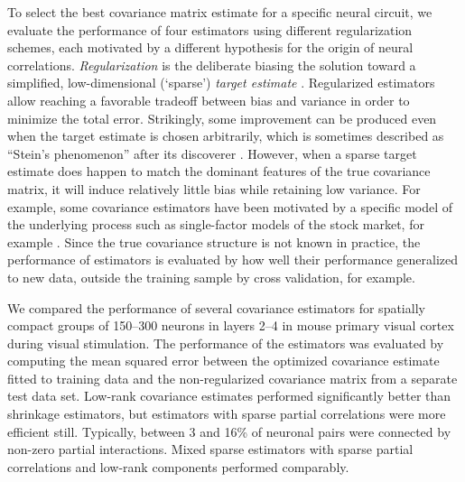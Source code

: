 To select the best covariance matrix estimate for a specific neural circuit, we evaluate the performance of four estimators using different regularization schemes, each motivated by  a different hypothesis for the origin of neural correlations. \emph{Regularization} is the deliberate biasing the solution toward a simplified, low-dimensional (`sparse') \emph{target estimate} \citep{Schafer:2005,Bickel:2006}.
Regularized estimators allow reaching a favorable tradeoff between bias and variance in order to minimize the total error.
Strikingly, some improvement can be produced even when the target estimate is chosen arbitrarily, which is sometimes described as ``Stein's phenomenon'' after its discoverer \cite{Stein:1956}.   However, when a sparse target estimate does happen to match the dominant features of the true covariance matrix, it will induce relatively little bias while retaining low variance.  For example, some covariance estimators have been motivated by a specific model of the underlying process such as single-factor models of the stock market, for example \citep{Ledoit:2003}. 
Since the true covariance structure is not known in practice, the performance of estimators is evaluated by how well their performance generalized to new data, outside the training sample by cross validation, for example. 


We compared the performance of several covariance estimators for spatially compact groups of 150--300 neurons in layers 2--4 in mouse primary visual cortex during visual stimulation.   The performance of the estimators was evaluated by computing the mean squared error between the optimized covariance estimate fitted to training data and the non-regularized covariance matrix from a separate test data set.  Low-rank covariance estimates performed significantly better than shrinkage estimators, but estimators with sparse partial correlations were more efficient still. Typically, between 3 and 16\% of neuronal pairs were connected by non-zero partial interactions.  Mixed sparse estimators with sparse partial correlations and low-rank components performed comparably. 

